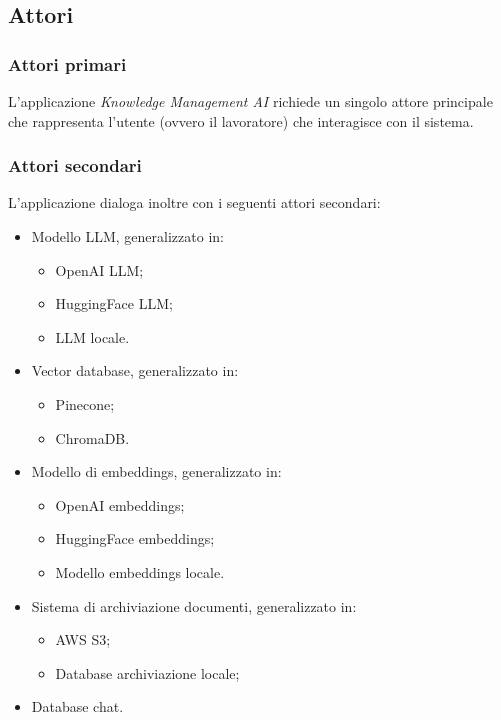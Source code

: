 \documentclass[10pt, a4paper]{article}
\begin{document}
\subsection{Attori}
\subsubsection{Attori primari}
L'applicazione \textit{Knowledge Management AI} richiede un singolo attore principale che rappresenta l'utente (ovvero il lavoratore) che interagisce con il sistema.
\subsubsection{Attori secondari}
L'applicazione dialoga inoltre con i seguenti attori secondari:
\begin{itemize}
    \item Modello LLM, generalizzato in:
        \begin{itemize}
            \item OpenAI LLM;
            \item HuggingFace LLM;
            \item LLM locale.
        \end{itemize}
    \item Vector database, generalizzato in:
        \begin{itemize}
            \item Pinecone;
            \item ChromaDB.
        \end{itemize}
    \item Modello di embeddings, generalizzato in:
        \begin{itemize}
            \item OpenAI embeddings;
            \item HuggingFace embeddings;
            \item Modello embeddings locale.
        \end{itemize}
    \item Sistema di archiviazione documenti, generalizzato in:
        \begin{itemize}
            \item AWS S3;
            \item Database archiviazione locale;
        \end{itemize}
    \item Database chat.
\end{itemize}
\end{document}
